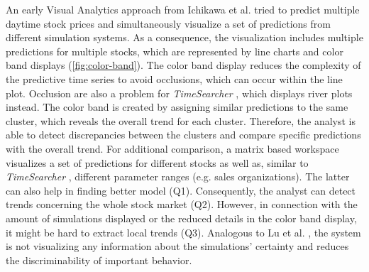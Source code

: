 \documentclass[electronic]{vgtc}             %
\begin{document}
An early Visual Analytics approach from Ichikawa et al. \cite{ichikawa:2002} tried to predict multiple daytime stock prices and simultaneously visualize a set of predictions from different simulation systems. 
As a consequence, the visualization includes multiple predictions for multiple stocks, which are represented by line charts and color band displays (\autoref{fig:color-band}).
The color band display reduces the complexity of the predictive time series to avoid occlusions, which can occur within the line plot. 
Occlusion are also a problem for \textit{TimeSearcher} \cite{buono:2007}, which displays river plots instead.
The color band is created by assigning similar predictions to the same cluster, which reveals the overall trend for each cluster.
Therefore, the analyst is able to detect discrepancies between the clusters and compare specific predictions with the overall trend. 
For additional comparison, a matrix based workspace visualizes a set of predictions for different stocks as well as, similar to \textit{TimeSearcher} \cite{buono:2007}, different parameter ranges (e.g. sales organizations). 
The latter can also help in finding better model (Q1).
Consequently, the analyst can detect trends concerning the whole stock market (Q2).  
However, in connection with the amount of simulations displayed or the reduced details in the color band display, it might be hard to extract local trends (Q3).
Analogous to Lu et al. \cite{lu:2014}, the system is not visualizing any information about the simulations' certainty and reduces the discriminability of important behavior. 
\end{document}
